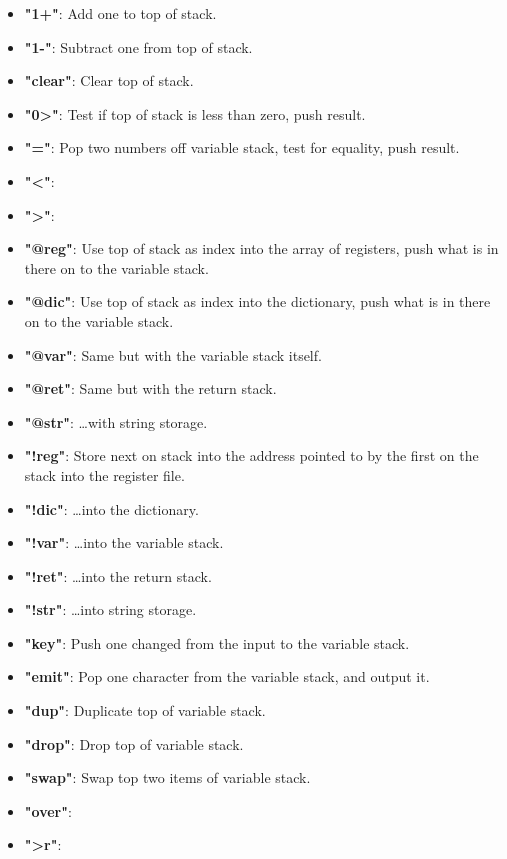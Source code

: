\documentclass	[a4paper, 10pt]	{article}
\begin{document}
\begin{itemize}
        \item \textbf{"1+"}: Add one to top of stack.
        \item \textbf{"1-"}: Subtract one from top of stack.
        \item \textbf{"clear"}: Clear top of stack.
        \item \textbf{"0>"}: Test if top of stack is less than zero, push result.
        \item \textbf{"="}: Pop two numbers off variable stack, test for equality,
        push result.
        \item \textbf{"<"}:
        \item \textbf{">"}:
        \item \textbf{"@reg"}: Use top of stack as index into the array of
        registers, push what is in there on to the variable stack.
        \item \textbf{"@dic"}: Use top of stack as index into the dictionary,
        push what is in there on to the variable stack.
        \item \textbf{"@var"}: Same but with the variable stack itself.
        \item \textbf{"@ret"}: Same but with the return stack.
        \item \textbf{"@str"}: \ldots with string storage.
        \item \textbf{"!reg"}: Store next on stack into the address pointed
        to by the first on the stack into the register file.
        \item \textbf{"!dic"}: \ldots into the dictionary.
        \item \textbf{"!var"}: \ldots into the variable stack.
        \item \textbf{"!ret"}: \ldots into the return stack.
        \item \textbf{"!str"}: \ldots into string storage.
        \item \textbf{"key"}: Push one changed from the input to the
        variable stack.
        \item \textbf{"emit"}: Pop one character from the variable stack,
        and output it.
        \item \textbf{"dup"}: Duplicate top of variable stack.
        \item \textbf{"drop"}: Drop top of variable stack.
        \item \textbf{"swap"}: Swap top two items of variable stack.
        \item \textbf{"over"}: 
        \item \textbf{">r"}:

\end{itemize}
\end{document}
